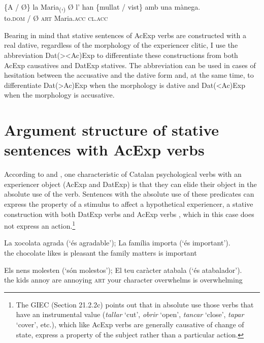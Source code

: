 \documentclass[output=paper,colorlinks,citecolor=brown,nonflat,modfonts]{langsci/langscibook}
\begin{document}
 \ex \label{ex:royo:17e}
 \gll \{A / Ø\} la Maria\textsubscript{(},\textsubscript{)} Ø l’ han \{mullat / vist\} amb una mànega.\\
 to.\textsc{dom} / Ø \textsc{art} Maria.\textsc{acc} \textsc{cl.acc} \\
\glt {}
 
 \z
 \z 

Bearing in mind that stative sentences of AcExp verbs are constructed with a real dative, regardless of the morphology of the experiencer clitic, I use the abbreviation Dat(>{\textbar}<Ac)Exp to differentiate these constructions from both AcExp causatives and DatExp statives. The abbreviation can be used in cases of hesitation between the accusative and the dative form and, at the same time, to differentiate Dat(>Ac)Exp when the morphology is dative and Dat(<Ac)Exp when the morphology is accusative.

\section{Argument structure of stative sentences with AcExp verbs}\label{sec:royo:5}

According to \citet[Sections 13.3.6.2a-b and 13.3.7.2b]{Rossello2008} and \citet[21.2.2b and 21.5a]{GIEC2016}, one characteristic of Catalan psychological verbs with an experiencer object (AcExp and DatExp) is that they can elide their object in the absolute use of the verb. Sentences with the absolute use of these predicates can express the property of a stimulus to affect a hypothetical experiencer, a stative construction with both DatExp verbs  and AcExp verbs , which in this case does not express an action.\footnote{The GIEC (Section 21.2.2c) points out that in absolute use those verbs that have an instrumental value (\textit{tallar} ‘cut’, \textit{obrir} ‘open’, \textit{tancar} ‘close’, \textit{tapar} ‘cover’, etc.), which like AcExp verbs are generally causative of change of state, express a property of the subject rather than a particular action.}

\ea%
 \label{ex:royo:18}
 \ea \label{ex:royo:18a}
 \gll La xocolata agrada (‘és agradable’); La família importa (‘és important’). \\
 the chocolate likes is pleasant the family matters is important\\
 \glt {}
 
 \ex \label{ex:royo:18b}
 \gll Els nens molesten (‘són molestos’); El teu caràcter atabala (‘és atabalador’).\\
  the kids annoy are annoying \textsc{art} your character overwhelms is overwhelming\\
 \glt  {}
 
\end{document}
